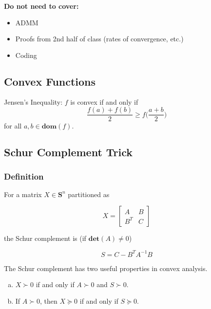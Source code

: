 \textbf{Do not need to cover:}

\begin{itemize}

\item ADMM

\item Proofs from 2nd half of class (rates of convergence, etc.)

\item Coding

\end{itemize}

\subsection{Convex Functions}

\begin{theorem} \label{cvx.jensen} Jensen's Inequality: \(f\) is convex if and only if
\[
\frac{f(a) + f(b)}{2} \geq f \bigg(\frac{a+b}{2} \bigg)
\]
for all \(a, b \in \textbf{dom}(f)\). 
\end{theorem}

\subsection{Schur Complement Trick}\label{cvx.schur.sec}

\subsubsection{Definition}

For a matrix \(X \in \boldsymbol{S}^n\) partitioned as 

\[
X = \begin{bmatrix} A & B \\ B^T & C\end{bmatrix}
\]

the Schur complement is (if \(\textbf{det}(A) \neq 0\))

\[
S = C - B^TA^{-1} B
\]

The Schur complement has two useful properties in convex analysis.

\begin{theorem}\label{cvx.schur.props}

\begin{enumerate}[(a)]

\item \(X \succ 0\) if and only if \(A \succ 0\) and \(S \succ 0\).

\item If \(A \succ 0\), then \(X \succeq 0\) if and only if \(S \succeq 0\).

\end{enumerate}

\end{theorem}

